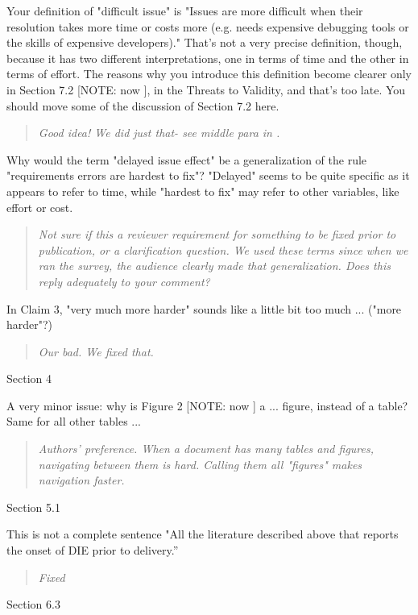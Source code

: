  
Your definition of "difficult issue" is "Issues are more
difficult when their resolution takes more time or costs
more (e.g. needs expensive debugging tools or the skills of
expensive developers)." That's not a very precise
definition, though, because it has two different
interpretations, one in terms of time and the other in terms
of effort. The reasons why you introduce this definition
become clearer only in Section 7.2 [NOTE: now ], in the Threats to
Validity, and that's too late. You should move some of the
discussion of Section 7.2 here.
\begin{quote}
{\em Good idea! We did just that- see middle para in .}
\end{quote}
Why would the term "delayed issue effect" be a
generalization of the rule "requirements errors are hardest
to fix"? "Delayed" seems to be quite specific as it appears
to refer to time, while "hardest to fix" may refer to other
variables, like effort or cost.
\begin{quote}
{\em Not sure if this a reviewer requirement for something to be fixed
prior to publication, or a clarification question. We used these
terms since when we ran the survey, the audience clearly made
that generalization. Does this reply adequately to your comment?}
\end{quote}
In Claim 3, "very much more harder" sounds like a
little bit too much ... ("more harder"?)
\begin{quote}
{\em Our bad. We fixed that.}
\end{quote}
Section 4

A very minor issue: why is Figure 2 [NOTE: now ] a ... figure, instead of
a table? Same for all other tables ...
\begin{quote}
{\em Authors' preference. When a document has many tables and figures, navigating
between them is hard. Calling them all "figures" makes navigation faster. }
\end{quote}
Section 5.1

This is not a complete sentence "All the literature
described above that reports the onset of DIE prior to delivery.''

\begin{quote}
{\em Fixed}
\end{quote}

Section 6.3

